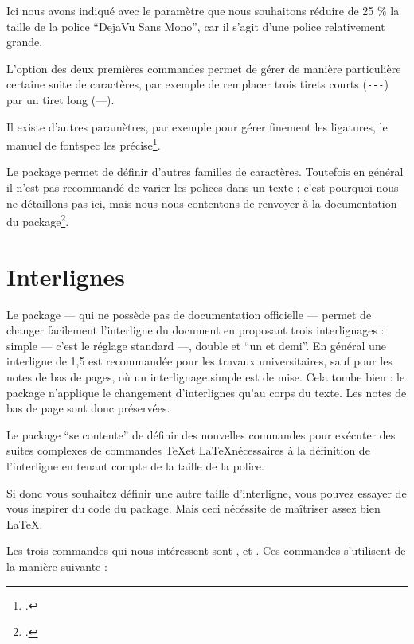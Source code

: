 Ici nous avons indiqué avec le paramètre  que nous souhaitons réduire de 25 \% la taille de la police \enquote{DejaVu Sans Mono}, car il s'agit d'une police relativement grande. 

L'option  des deux premières commandes permet de gérer de manière particulière certaine suite de caractères, par exemple de remplacer trois tirets courts (\verb|---|) par un tiret long (---). 

Il existe d'autres paramètres, par exemple pour gérer finement les ligatures, le manuel de fontspec les précise\footcite{fontspec_optionspolices}.

\begin{plusloins}
Le package  permet de définir d'autres familles de caractères. Toutefois en général il n'est pas recommandé de varier les polices dans un texte : c'est pourquoi nous ne détaillons pas ici, mais nous  nous contentons de renvoyer à la documentation du package\footcite{fontspec_nouvellefamille}.
\end{plusloins}

\section{Interlignes}\label{interligne}

Le package  --- qui ne possède pas de documentation officielle --- permet de changer facilement l'interligne du document en proposant trois interlignages : simple --- c'est le réglage standard ---, double et \enquote{un et demi}. En général une interligne de 1,5 est recommandée pour les travaux universitaires, sauf pour les notes de bas de pages, où un interlignage simple est de mise. Cela tombe bien : le package n'applique le changement d'interlignes qu'au corps du texte. Les notes de bas de page sont donc préservées.

\begin{plusloins}
Le package   \enquote{se contente} de définir des nouvelles commandes pour exécuter des suites complexes de commandes \TeX et \LaTeX nécessaires à la définition de l'interligne en tenant compte de la taille de la police.

Si donc vous souhaitez définir une autre taille d'interligne, vous pouvez essayer de vous inspirer du code du package. Mais ceci nécéssite de maîtriser assez bien \LaTeX. 
\end{plusloins}

Les trois commandes qui nous intéressent sont ,  et . Ces commandes s'utilisent de la manière suivante :

